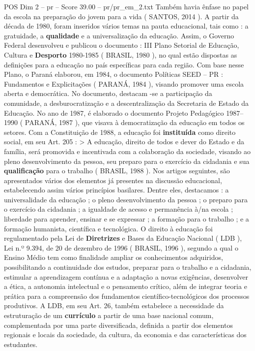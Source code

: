 \begin{textsample}{POS Dim 2 – pr – Score 39.00 – pr/pr\_em\_2.txt}
Também havia ênfase no papel da escola na preparação do jovem para a vida ( SANTOS, 2014 ).
A partir da década de 1980, foram inseridos vários temas na pauta educacional, tais como : a gratuidade, a \textbf{qualidade} e a universalização da educação.
Assim, o Governo Federal desenvolveu e publicou o documento : III Plano Setorial de Educação, Cultura e \textbf{Desporto} 1980-1985 ( BRASIL, 1980 ), no qual estão dispostas as definições para a educação no país específicas para cada região.
Com base nesse Plano, o Paraná elaborou, em 1984, o documento Políticas SEED – PR : Fundamentos e Explicitações ( PARANÁ, 1984 ), visando promover uma escola aberta e democrática.
No documento, destacam -se a participação da comunidade, a desburocratização e a descentralização da Secretaria de Estado da Educação.
No ano de 1987, é elaborado o documento Projeto Pedagógico 1987–1990 ( PARANÁ, 1987 ), que visava à democratização da educação em todos os setores.
Com a Constituição de 1988, a educação foi \textbf{instituída} como direito social, em seu Art. 205 : > A educação, direito de todos e dever do Estado e da família, será promovida e incentivada com a colaboração da sociedade, visando ao pleno desenvolvimento da pessoa, seu preparo para o exercício da cidadania e sua \textbf{qualificação} para o trabalho ( BRASIL, 1988 ).
Nos artigos seguintes, são apresentados vários dos elementos já presentes na discussão educacional, estabelecendo assim vários princípios basilares.
Dentre eles, destacamos : a universalidade da educação ; o pleno desenvolvimento da pessoa ; o preparo para o exercício da cidadania ; a igualdade de acesso e permanência à/na escola ; liberdade para aprender, ensinar e se expressar ; a formação para o trabalho ; e a formação humanista, científica e tecnológica.
O direito à educação foi regulamentado pela Lei de \textbf{Diretrizes} e Bases da Educação Nacional ( LDB ), Lei n.º 9.394, de 20 de dezembro de 1996 ( BRASIL, 1996 ), segundo a qual o Ensino Médio tem como finalidade ampliar os conhecimentos adquiridos, possibilitando a continuidade dos estudos, preparar para o trabalho e a cidadania, estimular a aprendizagem contínua e a adaptação a novas exigências, desenvolver a ética, a autonomia intelectual e o pensamento crítico, além de integrar teoria e prática para a compreensão dos fundamentos científico-tecnológicos dos processos produtivos.
A LDB, em seu Art. 26, também estabelece a necessidade da estruturação de um \textbf{currículo} a partir de uma base nacional comum, complementada por uma parte diversificada, definida a partir dos elementos regionais e locais da sociedade, da cultura, da economia e das características dos estudantes.

\end{textsample}
